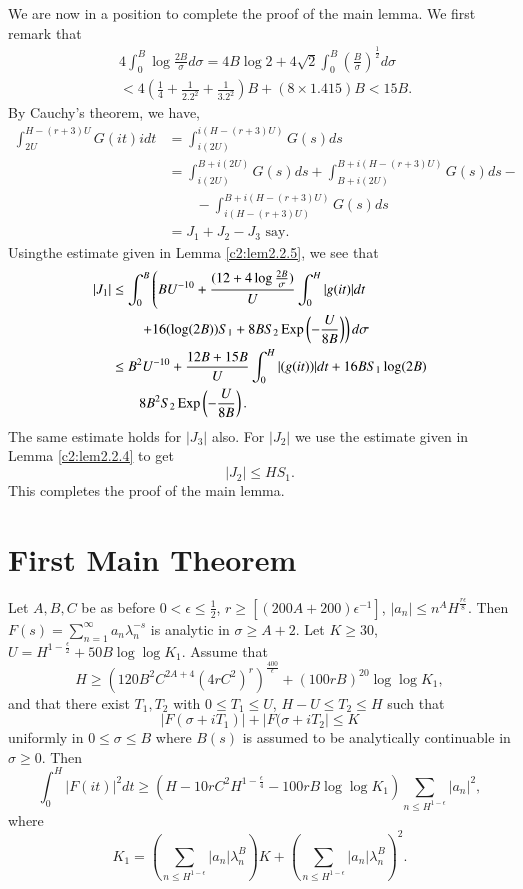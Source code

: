 We are now in a position to complete the proof of the main lemma. We first remark that
\begin{align*}
& 4 \int^B_0 \log \frac{2B}{\sigma} d \sigma = 4 B \log 2 + 4 \sqrt{2} \int^B_0 \left(\frac{B}{\sigma} \right)^{\frac{1}{2}} d \sigma\\
& < 4 \left(\frac{1}{4} + \frac{1}{2.2^2} + \frac{1}{3.2^2} \right) B + (8 \times 1.415) B < 15B.
\end{align*}
By Cauchy's theorem, we have,
\begin{align*}
\int^{H-(r+3)U}_{2U} G(it) idt & = \int^{i(H-(r+3)U)}_{i(2U)} G(s) ds\\
& = \int^{B+i(2U)}_{i(2U)} G(s) ds + \int^{B+i(H-(r+3)U)}_{B+i(2U)} G(s) ds -\\
& \qquad - \int^{B+i(H-(r+3)U)}_{i(H - (r+3)U)} G(s) ds\\
&  = J_1 + J_2 - J_3 \text{ say}. 
\end{align*}
Using\pageoriginale the estimate given in Lemma \ref{c2:lem2.2.5}, we see that
\begin{align*}
|J_1| & \leq \int^B_0 \left(BU^{-10} + \frac{(12+4 \log \frac{2B}{\sigma})}{U} \int^H_0 |g(it)| dt \right.\\
&  \qquad \left. + 16 (\log (2B)) S_1  + 8 BS_2 \operatorname{Exp} \left(-\frac{U}{8B}\right) \right) d \sigma\\
& \leq B^2 U^{-10} + \frac{12B+15B}{U} \int^H_0 |(g(it))| dt + 16 B S_1\log (2B)\\
& \qquad 8B^2 S_2 \operatorname{Exp} \left(-\frac{U}{8B} \right).
\end{align*}
The same estimate holds for $|J_3|$ also. For $|J_2|$ we use the estimate given in Lemma \ref{c2:lem2.2.4} to get
$$
|J_2| \leq HS_1.
$$
This completes the proof of the main lemma.

\section{First Main Theorem}\label{c2:sec2.3}
Let $A,B,C$ be as before $0 < \epsilon \leq \frac{1}{2}$, $r \geq [(200 A + 200) \epsilon^{-1} ]$, $|a_n| \leq n^A H^{\frac{r\epsilon}{8}}$. Then $F(s) = \sum^{\infty}_{n=1} a_n \lambda^{-s}_n$ is  analytic in $\sigma \geq A +2$. Let $K \geq 30$, $U = H^{1-\frac{\epsilon}{2}} +50 B \log \log K_1$. Assume that
$$
H \geq (120 B^2 C^{2A+4} (4rC^2)^r)^{\frac{400}{\epsilon}} + (100 rB)^{20} \log \log K_1, 
$$
and that there exist $T_1, T_2$ with $0 \leq T_1 \leq U$, $H - U \leq T_2 \leq H$ such that
$$
|F(\sigma + iT_1)| + |F (\sigma + iT_2| \leq K
$$
uniformly in $0\leq \sigma \leq B$ where $B(s)$ is assumed to be analytically continuable in $\sigma \geq 0$. Then
$$
\int^H_0 |F(it)|^2 dt \geq (H - 10 r C^2 H^{1-\frac{\epsilon}{4}} - 100 r B \log \log K_1) \sum\limits_{n \leq H^{1-\epsilon}} |a_n|^2,
$$
where 
$$
K_1 = \left( \sum\limits_{n \leq H^{1-\epsilon}} |a_n| \lambda^B_n \right)  K + \left(\sum\limits_{n\leq H^{1-\epsilon}} |a_n| \lambda^B_n \right)^2.
$$

